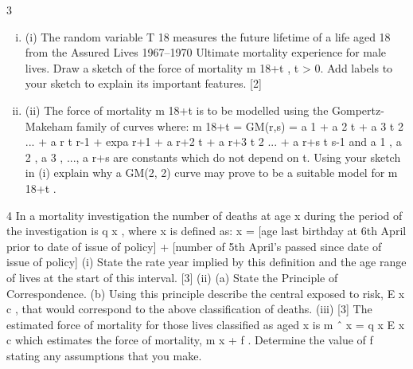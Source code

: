 \documentclass[a4paper,12pt]{article}
\begin{document}
\begin{enumerate}

3

\begin{enumerate}[(i)]
\item (i)
The random variable T 18 measures the future lifetime of a life aged 18 from
the Assured Lives 1967–1970 Ultimate mortality experience for male lives.
Draw a sketch of the force of mortality m 18+t , t > 0. Add labels to your sketch
to explain its important features.
[2]
\item (ii)
The force of mortality m 18+t is to be modelled using the Gompertz-Makeham family of curves where:
m 18+t = GM(r,s) = a 1 + a 2 t + a 3 t 2 ... + a r t r-1
+ exp{a r+1 + a r+2 t + a r+3 t 2 ... + a r+s t s-1 }
and a 1 , a 2 , a 3 , ..., a r+s are constants which do not depend on t.
Using your sketch in (i) explain why a GM(2, 2) curve may prove to be a suitable model for m 18+t .
\end{enumerate}
4
In a mortality investigation the number of deaths at age x during the period of the
investigation is q x , where x is defined as:
x = [age last birthday at 6th April prior to date of issue of policy]
+ [number of 5th April’s passed since date of issue of policy]
(i) State the rate year implied by this definition and the age range of lives at the
start of this interval.
[3]
(ii) (a)
State the Principle of Correspondence.
(b)
Using this principle describe the central exposed to risk, E x c , that
would correspond to the above classification of deaths.
(iii)
[3]
The estimated force of mortality for those lives classified as aged x is
m ˆ x =
q x
E x c
which estimates the force of mortality, m x + f . Determine the value of f stating
any assumptions that you make.


\end{enumerate}
\end{document}
